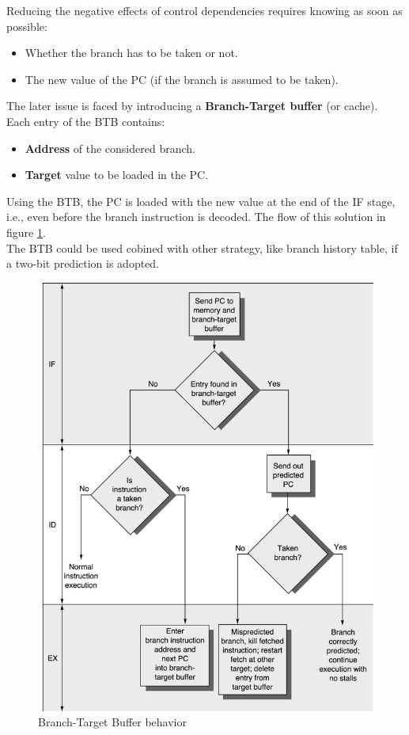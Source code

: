 \documentclass[12pt]{article}
\begin{document}
Reducing the negative effects of control dependencies requires knowing as soon as possible:
\begin{itemize}
  \item Whether the branch has to be taken or not.
  \item The new value of the PC (if the branch is assumed to be taken).
\end{itemize}
The later issue is faced by introducing a \textbf{Branch-Target buffer} (or cache). Each entry of the BTB contains:
\begin{itemize}
  \item \textbf{Address} of the considered branch.
  \item \textbf{Target} value to be loaded in the PC.
\end{itemize}
Using the BTB, the PC is loaded with the new value at the end of the IF stage, i.e., even before the branch instruction is decoded. The flow of this solution in figure \ref{fig:btb}.\\
The BTB could be used cobined with other strategy, like branch history table, if a two-bit prediction is adopted.
\begin{figure}[H]
  \centering
  \includegraphics[scale=0.75]{images/btb.png}
  \caption{Branch-Target Buffer behavior}
  \label{fig:btb}
\end{figure}
\end{document}
